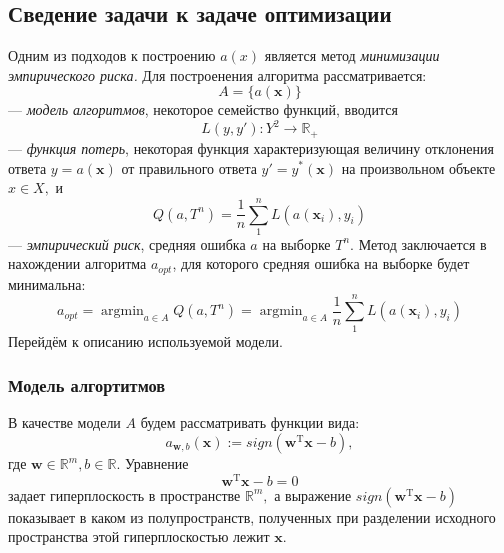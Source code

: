 \documentclass[%
bachelor,    %
subf,        %
href,        %
colorlinks,  %
]{disser}
\let\vec=\mathbf
\DeclareMathOperator*{\argmin}{argmin}
\begin{document}
\subsection{Сведение задачи к задаче оптимизации}
Одним из подходов к построению $a(x)$ является метод \textit{минимизации эмпирического риска.} Для построенения алгоритма рассматривается: $$A = \{a(\vec{x})\}$$ --- \textit{модель алгоритмов}, некоторое семейство функций, вводится 
\begin{equation}\label{def:loss_function}
L(y,y'): Y^2\to \mathbb{R_+}
\end{equation} 
--- \textit{функция потерь}, некоторая функция характеризующая величину отклонения ответа $y=a(\vec{x})$ от правильного ответа $y'=y^{*}(\vec{x})$ на произвольном объекте $x \in X,$ и\\
\begin{equation}\label{def:empirical_risk} 
Q(a,T^n)= \frac{1}{n} \sum_{1}^{n}L(a(\vec{x}_i),y_i)
\end{equation} 
--- \textit{эмпирический риск}, средняя ошибка $a$ на выборке $T^n.$
Метод заключается в нахождении алгоритма $a_{opt}$, для которого средняя ошибка на выборке будет минимальна:\cite{erm}
\begin{equation}
a_{opt} = \argmin_{a \in A} Q(a,T^n) 
=\argmin_{a \in A} \frac{1}{n} \sum_{1}^{n}L(a(\vec{x}_i),y_i) 
\end{equation}
Перейдём к описанию используемой модели.

\subsubsection{Модель алгортитмов}
В качестве модели $A$ будем рассматривать функции вида:
$$a_{\vec{w},b}(\vec{x}) := sign(\vec{w}^\mathrm{T}\vec{x} - b),$$ где $\vec{w} \in \mathbb{R}^m, b \in \mathbb{R}$.
Уравнение
\begin{equation}\label{def:plane_equation}
\vec{w}^\mathrm{T}\vec{x} - b= 0
\end{equation}
задает гиперплоскость в пространстве $\mathbb{R}^m,$ а выражение $sign(\vec{w}^\mathrm{T}\vec{x} - b)$ показывает в каком из полупространств, полученных при разделении исходного пространства этой гиперплоскостью лежит $\vec{x}.$ 
\end{document}
